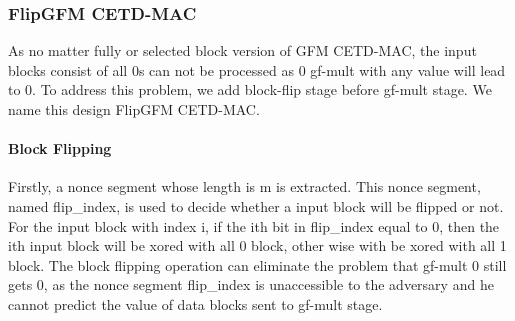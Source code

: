 \subsubsection{FlipGFM CETD-MAC}
As no matter fully or selected block version of GFM CETD-MAC, the input blocks consist of all 0s can not be processed as 0 gf-mult with any value will lead to 0. To address this problem, we add block-flip stage before gf-mult stage. We name this design FlipGFM CETD-MAC.
\paragraph{Block Flipping}
Firstly, a nonce segment whose length is m is extracted. This nonce segment, named flip\_index, is used to decide whether a input block will be flipped or not. For the input block with index i, if the ith bit in flip\_index equal to 0, then the ith input block will be xored with all 0 block, other wise with be xored with all 1 block.   
The block flipping operation can eliminate the problem that gf-mult 0 still gets 0, as the nonce segment flip\_index is unaccessible to the adversary and he cannot predict the value of data blocks sent to gf-mult stage.
